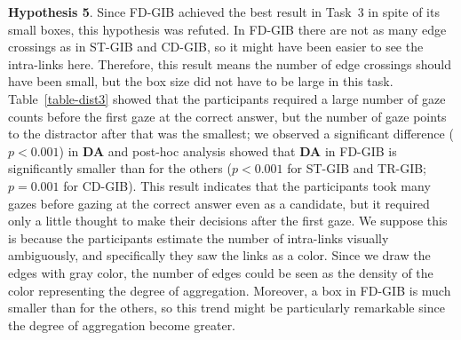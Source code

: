 \documentclass[review]{vgtc}                 %
\begin{document}
{\bf Hypothesis 5}. Since FD-GIB achieved the best result in Task~3 in spite of its small boxes, this hypothesis was refuted. In FD-GIB there are not as many edge crossings as in ST-GIB and CD-GIB, so it might have been easier to see the intra-links here. Therefore, this result means the number of edge crossings should have been small, but the box size did not have to be large in this task.
Table~\ref{table-dist3} showed that the participants required a large number of gaze counts before the first gaze at the correct answer, but the number of gaze points to the distractor after that was the smallest; we observed a significant difference ($p<0.001$) in {\bf DA} and post-hoc analysis showed that {\bf DA} in FD-GIB is significantly smaller than for the others ($p<0.001$ for ST-GIB and TR-GIB; $p=0.001$ for CD-GIB).
This result indicates that the participants took many gazes before gazing at the correct answer even as a candidate, but it required only a little thought to make their decisions after the first gaze.
We suppose this is because the participants estimate the number of intra-links visually ambiguously, and specifically they saw the links as a color.
Since we draw the edges with gray color, the number of edges could be seen as the density of the color representing the degree of aggregation.
Moreover, a box in FD-GIB is much smaller than for the others, so this trend might be particularly remarkable since the degree of aggregation become greater.
\end{document}
